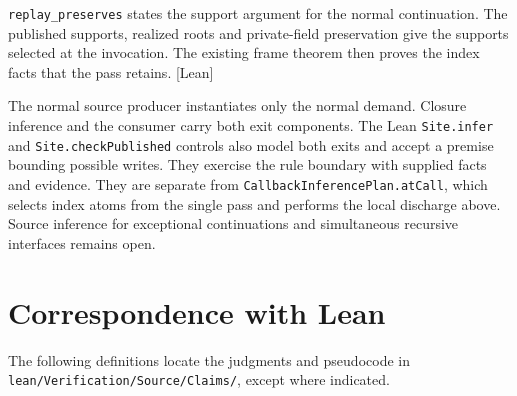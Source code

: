 \documentclass[10pt,a4paper]{article}
\theoremstyle{definition}
\newcommand{\code}[1]{\textcolor{codec}{\texttt{#1}}}
\newcommand{\lean}[1]{\textcolor{leanc}{\texttt{\small #1}}}
\newcommand{\status}[1]{\textcolor{leanc}{\textsf{\small[#1]}}}
\begin{document}
\lean{replay\_preserves} states the support argument for the
normal continuation. The published supports,
realized roots and private-field preservation give the supports selected
at the invocation. The existing frame theorem then proves the index
facts that the pass retains. \status{Lean}

The normal source producer instantiates only the normal demand.
Closure inference and the consumer carry both exit components.
The Lean \lean{Site.infer} and \lean{Site.checkPublished} controls
also model both exits and accept a premise bounding possible
writes. They exercise the rule boundary with supplied facts and
evidence. They are separate from \lean{CallbackInferencePlan.atCall},
which selects index atoms from the single pass and performs the
local discharge above. Source inference for exceptional
continuations and simultaneous recursive interfaces remains open.

\section{Correspondence with Lean}\label{sec:correspondence}

The following definitions locate the judgments and pseudocode in
\code{lean/Verification/Source/Claims/}, except where indicated.
\end{document}
